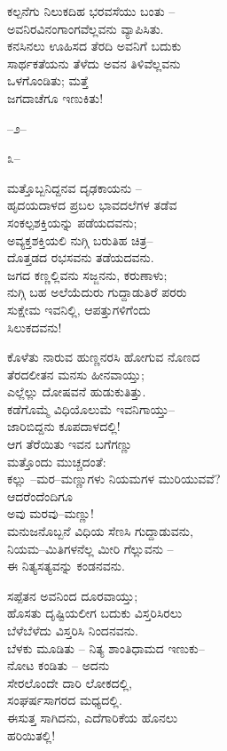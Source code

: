 \begin{myquote}
ಕಲ್ಪನೆಗು ನಿಲುಕದಿಹ ಭರವಸೆಯು ಬಂತು –\\ಅವನಿರವಿನಂಗಾಂಗವೆಲ್ಲವನು ವ್ಯಾಪಿಸಿತು.\\ಕನಸಿನಲು ಊಹಿಸದ ತೆರದಿ ಅವನಿಗೆ ಬದುಕು\\ಸಾರ್ಥಕತೆಯನು ತೆಳೆದು ಅವನ ತಿಳಿವೆಲ್ಲವನು\\ಒಳಗೊಂಡಿತು; ಮತ್ತೆ\\ಜಗದಾಚೆಗೂ ಇಣುಕಿತು!
\end{myquote}


\begin{center}
–೨–
\end{center}

\begin{center}
೩–
\end{center}

\begin{myquote}
ಮತ್ತೊಬ್ಬನಿದ್ದನವ ದೃಢಕಾಯನು –\\ಹೃದಯದಾಳದ ಪ್ರಬಲ ಭಾವದಲೆಗಳ ತಡೆವ\\ಸಂಕಲ್ಪಶಕ್ತಿಯನ್ನು ಪಡೆಯದವನು;\\ಅವ್ಯಕ್ತಶಕ್ತಿಯಲಿ ನುಗ್ಗಿ ಬರುತಿಹ ಚಿತ್ರ–\\ದೊತ್ತಡದ ರಭಸವನು ತಡೆಯದವನು.\\ಜಗದ ಕಣ್ಣಲ್ಲಿವನು ಸಜ್ಜನನು, ಕರುಣಾಳು;\\ನುಗ್ಗಿ ಬಹ ಅಲೆಯೆದುರು ಗುದ್ದಾಡುತಿರೆ ಪರರು\\ಸುಕ್ಷೇಮ ಇವನಿಲ್ಲಿ, ಆಪತ್ತುಗಳಿಗೆಂದು\\ಸಿಲುಕದವನು!
\end{myquote}

\begin{myquote}
ಕೊಳೆತು ನಾರುವ ಹುಣ್ಣನರಸಿ ಹೋಗುವ ನೊಣದ\\ತೆರದಲೀತನ ಮನಸು ಹೀನವಾಯ್ತು;\\ಎಲ್ಲೆಲ್ಲು ದೋಷವನೆ ಹುಡುಕುತಿತ್ತು.\\ಕಡೆಗೊಮ್ಮೆ ವಿಧಿಯೊಲುಮೆ ಇವನಿಗಾಯ್ತು–\\ಜಾರಿಬಿದ್ದನು ಕೂಪದಾಳದಲ್ಲಿ!\\ಆಗ ತೆರೆಯಿತು ಇವನ ಬಗೆಗಣ್ಣು\\ಮತ್ತೊಂದು ಮುಚ್ಚದಂತೆ:\\ಕಲ್ಲು –ಮರ–ಮಣ್ಣುಗಳು ನಿಯಮಗಳ ಮುರಿಯುವವೆ?\\ಆದರೆಂದೆಂದಿಗೂ\\ಅವು ಮರವು–ಮಣ್ಣು!\\ಮನುಜನೊಬ್ಬನೆ ವಿಧಿಯ ಸೆಣಸಿ ಗುದ್ದಾಡುವನು,\\ನಿಯಮ–ಮಿತಿಗಳನೆಲ್ಲ ಮೀರಿ ಗೆಲ್ಲುವನು –\\ಈ ನಿತ್ಯಸತ್ಯವನ್ನು ಕಂಡನವನು.
\end{myquote}

\begin{myquote}
ಸಪ್ಪೆತನ ಅವನಿಂದ ದೂರವಾಯ್ತು;\\ಹೊಸತು ದೃಷ್ಟಿಯಲೀಗ ಬದುಕು ವಿಸ್ತರಿಸಿರಲು\\ಬೆಳೆಬೆಳೆದು ವಿಸ್ತರಿಸಿ ನಿಂದನವನು.\\ಬೆಳಕು ಮೂಡಿತು – ನಿತ್ಯ ಶಾಂತಿಧಾಮದ ಇಣುಕು–\\ನೋಟ ಕಂಡಿತು – ಅದನು\\ಸೇರಲೊಂದೇ ದಾರಿ ಲೋಕದಲ್ಲಿ,\\ಸಂಘರ್ಷಸಾಗರದ ಮಧ್ಯದಲ್ಲಿ.\\ಈಸುತ್ತ ಸಾಗಿದನು, ಎದೆಗಾರಿಕೆಯ ಹೊನಲು\\ಹರಿಯಿತಲ್ಲಿ!
\end{myquote}


